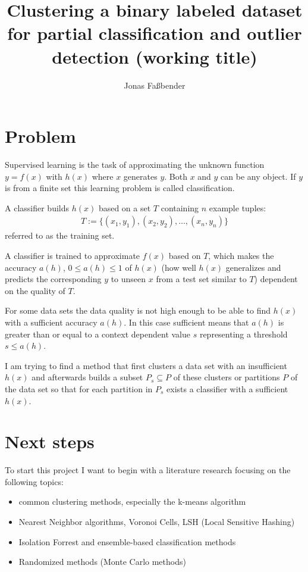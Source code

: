 \documentclass[12pt]{article}
\title{Clustering a binary labeled dataset for
  partial classification and outlier detection (working title)}
\author{Jonas Fa{\ss}bender}
\date{}
\begin{document}
\maketitle

\section{Problem}

Supervised learning is the task of approximating the
unknown function $y = f(x)$ with $h(x)$ where $x$ generates
$y$. Both $x$ and $y$ can be any object. If $y$ is from a
finite set this learning problem is called classification.

A classifier builds $h(x)$ based on a set $T$ containing
$n$ example tuples:
\begin{align*}
T := \{(x_1, y_1), (x_2, y_2), \dots ,(x_n,y_n)\}
\end{align*}
referred to as the training set.\cite{ki}

A classifier is trained to approximate $f(x)$ based on $T$,
which makes the accuracy $a(h)$, $0 \leq a(h) \leq 1$ of
$h(x)$ (how well $h(x)$ generalizes and predicts the
corresponding $y$ to unseen $x$ from a test set similar to
$T$) dependent on the quality of $T$.\cite{tc_data}

For some data sets the data quality is not high
enough to be able to find $h(x)$ with a sufficient
accuracy $a(h)$. In this case sufficient means that $a(h)$
is greater than or equal to a context dependent value $s$
representing a threshold $s \leq a(h)$.

I am trying to find a method that first clusters a data set
with an insufficient $h(x)$ and afterwards builds a subset
$P_s \subseteq P$ of these clusters or partitions $P$ of
the data set so that for each partition in $P_s$ exists a
classifier with a sufficient $h(x)$.

\section{Next steps}

To start this project I want to begin with a literature
research focusing on the following topics:

\begin{itemize}

  \item common clustering methods, especially the k-means
        algorithm

  \item Nearest Neighbor algorithms, Voronoi Cells, LSH
        (Local Sensitive Hashing)

  \item Isolation Forrest and ensemble-based classification
        methods

  \item Randomized methods (Monte Carlo methods)

\end{itemize}


\end{document}
